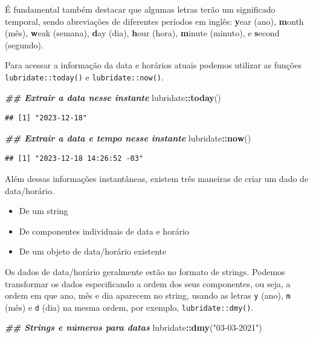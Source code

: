 \documentclass[
]{article}
\newenvironment{Shaded}{\begin{snugshade}}{\end{snugshade}}
\newcommand{\DocumentationTok}[1]{\textcolor[rgb]{0.56,0.35,0.01}{\textbf{\textit{#1}}}}
\newcommand{\FunctionTok}[1]{\textcolor[rgb]{0.13,0.29,0.53}{\textbf{#1}}}
\newcommand{\NormalTok}[1]{#1}
\newcommand{\SpecialCharTok}[1]{\textcolor[rgb]{0.81,0.36,0.00}{\textbf{#1}}}
\newcommand{\StringTok}[1]{\textcolor[rgb]{0.31,0.60,0.02}{#1}}
\providecommand{\tightlist}{%
  \setlength{\itemsep}{0pt}\setlength{\parskip}{0pt}}
\begin{document}
É fundamental também destacar que algumas letras terão um significado temporal, sendo abreviações de diferentes períodos em inglês: \textbf{y}ear (ano), \textbf{m}onth (mês), \textbf{w}eak (semana), \textbf{d}ay (dia), \textbf{h}our (hora), \textbf{m}inute (minuto), e \textbf{s}econd (segundo).

Para acessar a informação da data e horários atuais podemos utilizar as funções \texttt{lubridate::today()} e \texttt{lubridate::now()}.

\begin{Shaded}
\begin{Highlighting}[]
\DocumentationTok{\#\# Extrair a data nesse instante}
\NormalTok{lubridate}\SpecialCharTok{::}\FunctionTok{today}\NormalTok{()}
\end{Highlighting}
\end{Shaded}

\begin{verbatim}
## [1] "2023-12-18"
\end{verbatim}

\begin{Shaded}
\begin{Highlighting}[]
\DocumentationTok{\#\# Extrair a data e tempo nesse instante}
\NormalTok{lubridate}\SpecialCharTok{::}\FunctionTok{now}\NormalTok{()}
\end{Highlighting}
\end{Shaded}

\begin{verbatim}
## [1] "2023-12-18 14:26:52 -03"
\end{verbatim}

Além dessas informações instantâneas, existem três maneiras de criar um dado de data/horário.

\begin{itemize}
\tightlist
\item
  De um string
\item
  De componentes individuais de data e horário
\item
  De um objeto de data/horário existente
\end{itemize}

Os dados de data/horário geralmente estão no formato de strings. Podemos transformar os dados especificando a ordem dos seus componentes, ou seja, a ordem em que ano, mês e dia aparecem no string, usando as letras \texttt{y} (ano), \texttt{m} (mês) e \texttt{d} (dia) na mesma ordem, por exemplo, \texttt{lubridate::dmy()}.

\begin{Shaded}
\begin{Highlighting}[]
\DocumentationTok{\#\# Strings e números para datas}
\NormalTok{lubridate}\SpecialCharTok{::}\FunctionTok{dmy}\NormalTok{(}\StringTok{"03{-}03{-}2021"}\NormalTok{)}
\end{Highlighting}
\end{Shaded}
\end{document}
